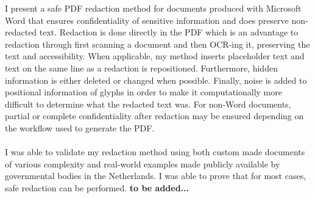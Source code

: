I present a safe PDF redaction method for documents produced with Microsoft Word that ensures confidentiality of sensitive information and does preserve non-redacted text. Redaction is done directly in the PDF which is an advantage to redaction through first scanning a document and then OCR-ing it, preserving the text and accessibility. When applicable, my method inserts placeholder text and text on the same line as a redaction is repositioned. Furthermore, hidden information is either deleted or changed when possible. Finally, noise is added to positional information of glyphs in order to make it computationally more difficult to determine what the redacted text was. For non-Word documents, partial or complete confidentiality after redaction may be ensured depending on the workflow used to generate the PDF.
\\\\
I was able to validate my redaction method using both custom made documents of various complexity and real-world examples made publicly available by governmental bodies in the Netherlands. I was able to prove that for most cases, safe redaction can be performed. \textbf{to be added...}
\\\\


